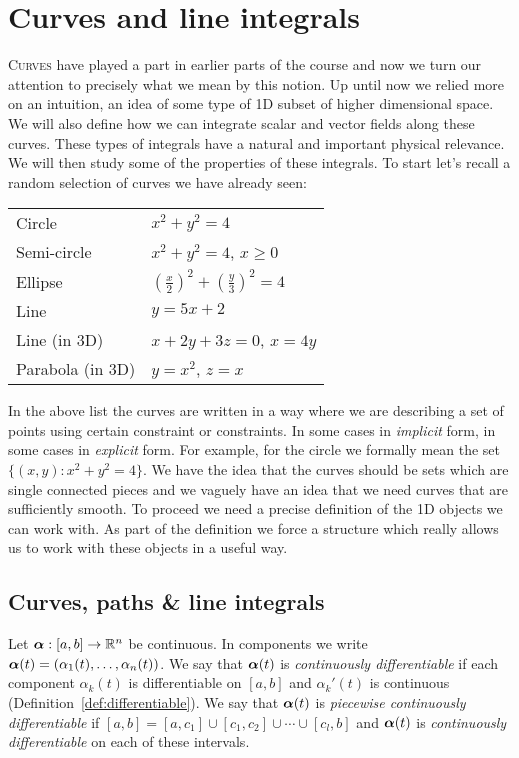 \chapter{Curves and line integrals}

\lettrine{C}{urves} have played a part in earlier parts of the course and now we turn our attention to precisely what we mean by this notion.
Up until now we relied more on an intuition, an idea of some type of 1D subset of higher dimensional space.
We will also define how we can integrate scalar and vector fields along these curves.
These types of integrals have a natural and important physical relevance.
We will then study some of the properties of these integrals.
To start let's recall a random selection of curves we have already seen:

\begin{center}
    \begin{tabular}{l l}
        Circle           & \(x^2+y^2 = 4\)                               \\
        Semi-circle      & \(x^2+y^2 = 4\), \(x\geq 0\)                  \\
        Ellipse          & \({(\frac{x}{2})}^2 + {(\frac{y}{3})}^2 = 4\) \\
        Line             & \(y=5x+2\)                                    \\
        Line (in 3D)     & \(x+2y+3z=0\), \(x=4y\)                       \\
        Parabola (in 3D) & \(y=x^2\), \(z=x\)
    \end{tabular}
\end{center}

\noindent
In the above list the curves are written in a way where we are describing a set of points using certain constraint or constraints. In some cases in \emph{implicit} form, in some cases in \emph{explicit} form.
For example, for the circle we formally mean the set  \(\{(x,y):x^2+y^2 = 4\}\).
We have the idea that the curves should be sets which are single connected pieces and we vaguely have an idea that we need curves that are sufficiently smooth.
To proceed we need a precise definition of the 1D objects we can work with.
As part of the definition we force a structure which really allows us to work with these objects in a useful way.

\section{Curves, paths \& line integrals}
Let \(\boldsymbol{\alpha} : [a,b] \to \mathbb{R}^n\) be continuous.
In components we write \(\boldsymbol{\alpha}(t) = (\alpha_1(t),\ldots,\alpha_n(t))\).
We say that \(\boldsymbol{\alpha}(t)\) is \emph{continuously differentiable} if each component \(\alpha_k(t)\) is differentiable on \([a,b]\) and \(\alpha_k'(t)\) is continuous (Definition~\ref{def:differentiable}).
We say that \(\boldsymbol{\alpha}(t)\) is \emph{piecewise continuously differentiable} if \([a,b] = [a,c_1]\cup[c_1,c_2] \cup \cdots \cup [c_l,b]\) and \(\boldsymbol{\alpha}(t)\) is \emph{continuously differentiable} on each of these intervals.

